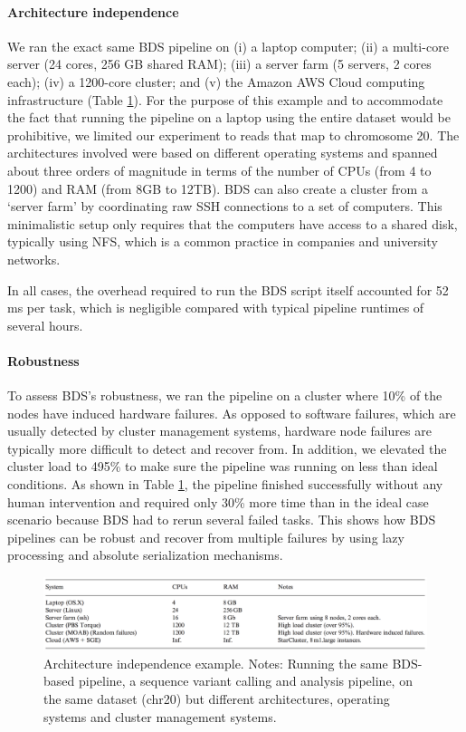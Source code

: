 \paragraph{Architecture independence} We ran the exact same BDS pipeline on (i) a laptop computer; (ii) a multi-core server (24 cores, 256 GB shared RAM); (iii) a server farm (5 servers, 2 cores each); (iv) a 1200-core cluster; and (v) the Amazon AWS Cloud computing infrastructure (Table \ref{fig:bdstablearch}). For the purpose of this example and to accommodate the fact that running the pipeline on a laptop using the entire dataset would be prohibitive, we limited our experiment to reads that map to chromosome 20. The architectures involved were based on different operating systems and spanned about three orders of magnitude in terms of the number of CPUs (from 4 to 1200) and RAM (from 8GB to 12TB). BDS can also create a cluster from a ‘server farm’ by coordinating raw SSH connections to a set of computers. This minimalistic setup only requires that the computers have access to a shared disk, typically using NFS, which is a common practice in companies and university networks.

In all cases, the overhead required to run the BDS script itself accounted for 52 ms per task, which is negligible compared with typical pipeline runtimes of several hours.

\paragraph{Robustness} To assess BDS’s robustness, we ran the pipeline on a cluster where 10\% of the nodes have induced hardware failures. As opposed to software failures, which are usually detected by cluster management systems, hardware node failures are typically more difficult to detect and recover from. In addition, we elevated the cluster load to 495\% to make sure the pipeline was running on less than ideal conditions. As shown in Table \ref{fig:bdstablearch}, the pipeline finished successfully without any human intervention and required only 30\% more time than in the ideal case scenario because BDS had to rerun several failed tasks. This shows how BDS pipelines can be robust and recover from multiple failures by using lazy processing and absolute serialization mechanisms.

\begin{figure}
    \centering
    \includegraphics[width=14cm]{bds_table_1.png}
    \caption{Architecture independence example. Notes: Running the same BDS-based pipeline, a sequence variant calling and analysis pipeline, on the same dataset (chr20) but different architectures, operating systems and cluster management systems.}
    \label{fig:bdstablearch}
\end{figure}


